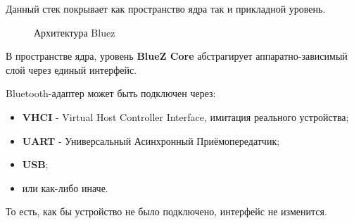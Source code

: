 Данный стек покрывает как пространство ядра так и прикладной уровень.
\begin{figure}[H]
  \centering
  \caption{Архитектура Bluez}
\end{figure}
В пространстве ядра, уровень \textbf{BlueZ Core} абстрагирует аппаратно-зависимый слой через единый интерфейс.

Bluetooth-адаптер может быть подключен через:
\begin{itemize}
\item \textbf{VHCI} - Virtual Host Controller Interface, имитация реального устройства;
\item \textbf{UART} - Универсальный Асинхронный Приёмопередатчик;
\item \textbf{USB};
\item или как-либо иначе.
\end{itemize}
То есть, как бы устройство не было подключено, интерфейс не изменится.

